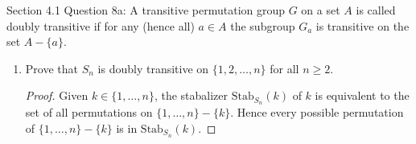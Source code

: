 Section 4.1 Question 8a:
A transitive permutation group $G$ on a set $A$ is called doubly transitive
if for any (hence all) $a\in A$ the subgroup $G_a$ is transitive on the set
$A-\{a\}$.
\begin{enumerate}
  \item Prove that $S_n$ is doubly transitive on $\{1,2,\ldots,n\}$ for
    all $n\geq2$.
    \begin{proof}
      Given $k\in\{1,\ldots,n\}$, the stabalizer $\text{Stab}_{S_n}(k)$ of
      $k$ is equivalent to the set of all permutations on
      $\{1,\ldots,n\}-\{k\}$. Hence every possible permutation of
      $\{1,\ldots,n\}-\{k\}$ is in $\text{Stab}_{S_n}(k)$.
    \end{proof}
\end{enumerate}
